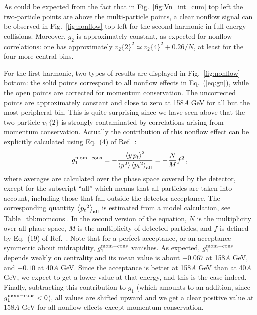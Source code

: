 \documentclass[aps,prc,superscriptaddress,showpacs,floatfix,nofootinbib]{revtex4}
\newcommand{\mean}[1]{\left\langle #1 \right\rangle}
\begin{document}
As could be expected from the fact that in Fig.~\ref{fig:Vn_int_cum}
top left the two-particle points are above the multi-particle points,
a clear nonflow signal can be observed in Fig.~\ref{fig:nonflow} top
left for the second harmonic in full energy collisions.  Moreover,
$g_2$ is approximately constant, as expected for nonflow correlations:
one has approximately $v_2\{2\}^2 \simeq v_2\{4\}^2 + 0.26/N$, at
least for the four more central bins.

For the first harmonic, two types of results are displayed in
Fig.~\ref{fig:nonflow} bottom: the solid points correspond to all
nonflow effects in Eq.\ (\ref{eq:gn}), while the open points are
corrected for momentum conservation. The uncorrected points are
approximately constant and close to zero at 158$A$ GeV for all
but the most peripheral bin. This is quite surprising since we have
seen above that the two-particle $v_1\{2\}$ is strongly contaminated
by correlations arising from momentum conservation.  Actually the
contribution of this nonflow effect can be explicitly calculated using
Eq.\ (4) of Ref.~\cite{Borghini:2002mv}:
\begin{equation}
\label{g1^mom-cons}
g_1^{\rm mom-cons} = - \frac{\mean{y \, p_t}^2}{\mean{y^2}
  \mean{{p_t}^2}_{\rm all}} = - \frac{N}{M} f^2\,,
\end{equation}
where averages are calculated over the phase space covered by the
detector, except for the subscript ``all'' which means that all
particles are taken into account, including those that fall outside
the detector acceptance.  The corresponding quantity
$\mean{{p_t}^2}_{\rm all}$ is estimated from a model calculation, see
Table~\ref{tbl:momcons}.  In the second version of the equation, $N$
is the multiplicity over all phase space, $M$ is the multiplicity of
detected particles, and $f$ is defined by Eq.\ (19) of
Ref.~\cite{Borghini:2002mv}. Note that for a perfect acceptance, or an
acceptance symmetric about midrapidity, $g_1^{\rm mom-cons}$
vanishes. As expected, $g_1^{\rm mom-cons}$ depends weakly on
centrality and its mean value is about $-0.067$ at 158$A$ GeV, and
$-0.10$ at 40$A$ GeV. Since the acceptance is better at 158$A$ GeV
than at 40$A$ GeV, we expect to get a lower value at that energy, and
this is the case indeed. Finally, subtracting this contribution to
$g_1$ (which amounts to an addition, since $g_1^{\rm mom-cons} < 0$),
all values are shifted upward and we get a clear positive value at
158$A$ GeV for all nonflow effects except momentum conservation.
\end{document}
